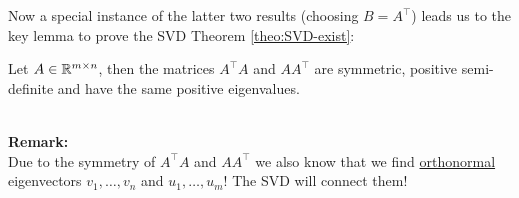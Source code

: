  
\begin{frame}
Now a special instance of the latter two results (choosing $B=A^\top$) leads us to the key lemma to prove the SVD Theorem \ref{theo:SVD-exist}: \vspace{-0.1cm}
\begin{lemma} \label{lem:eigenvalues_of_products}
	Let $A \in {\mathbb{R}}^{m\times n}$, then the matrices $A^\top A$ and $AA^\top $ are symmetric, positive semi-definite and have the same positive eigenvalues.
\end{lemma}
~\\
\textbf{Remark:} ~\\Due to the symmetry of $A^\top A$ and $AA^\top $ we also know that we find \underline{orthonormal} eigenvectors $v_1,\ldots, v_n$ and $u_1,\ldots, u_m$! The SVD will connect them!
\end{frame}


